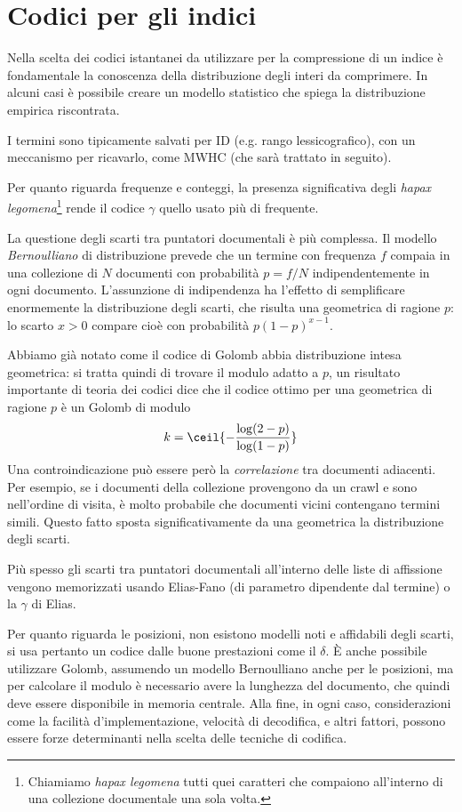 \section{Codici per gli indici}
Nella scelta dei codici istantanei da utilizzare per la compressione di un indice è fondamentale la conoscenza della distribuzione degli interi da comprimere. In alcuni casi è possibile creare un modello statistico che spiega la distribuzione empirica riscontrata.

I termini sono tipicamente salvati per ID (e.g. rango lessicografico), con un meccanismo per ricavarlo, come MWHC (che sarà trattato in seguito).

Per quanto riguarda frequenze e conteggi, la presenza significativa degli \textit{hapax legomena}\footnote{Chiamiamo \textit{hapax legomena} tutti quei caratteri che compaiono all'interno di una collezione documentale una sola volta.} rende il codice $\gamma$ quello usato più di frequente.

La questione degli scarti tra puntatori documentali è più complessa. Il modello \textit{Bernoulliano} di distribuzione prevede che un termine con frequenza $f$ compaia in una collezione di $N$ documenti con probabilità $p = f / N$ indipendentemente in ogni documento. L'assunzione di indipendenza ha l'effetto di semplificare enormemente la distribuzione degli scarti, che risulta una geometrica di ragione $p$: lo scarto $x > 0$ compare cioè con probabilità $p(1 - p)^{x - 1}$.

Abbiamo già notato come il codice di Golomb abbia distribuzione intesa geometrica: si tratta quindi di trovare il modulo adatto a $p$, un risultato importante di teoria dei codici dice che il codice ottimo per una geometrica di ragione $p$ è un Golomb di modulo
\begin{equation}
	k = \ceil{- \frac{\log(2 - p)}{\log(1 - p)}}
\end{equation}
Una controindicazione può essere però la \textit{correlazione} tra documenti adiacenti. Per esempio, se i documenti della collezione provengono da un crawl e sono nell'ordine di visita, è molto probabile che documenti vicini contengano termini simili. Questo fatto sposta significativamente da una geometrica la distribuzione degli scarti.

Più spesso gli scarti tra puntatori documentali all'interno delle liste di affissione vengono memorizzati usando Elias-Fano (di parametro dipendente dal termine) o la $\gamma$ di Elias.

Per quanto riguarda le posizioni, non esistono modelli noti e affidabili degli scarti, si usa pertanto un codice dalle buone prestazioni come il $\delta$. È anche possibile utilizzare Golomb, assumendo un modello Bernoulliano anche per le posizioni, ma per calcolare il modulo è necessario avere la lunghezza del documento, che quindi deve essere disponibile in memoria centrale. Alla fine, in ogni caso, considerazioni come la facilità d'implementazione, velocità di decodifica, e altri fattori, possono essere forze determinanti nella scelta delle tecniche di codifica.
